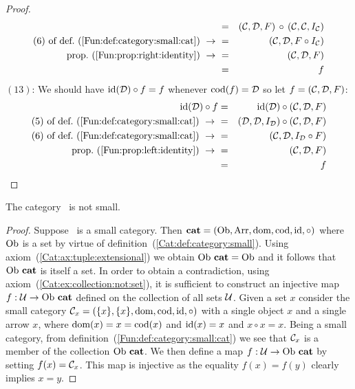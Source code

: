 \begin{proof}
\begin{eqnarray*}
            &=&(\Cat,\Dat,F)\,\circ\,(\Cat,\Cat,I_{\cal C})\\
            \mbox{$(6)$ of def.~(\ref{Fun:def:category:small:cat})}\ \to\ 
            &=&(\Cat,\Dat,F\circ I_{\cal C})\\
            \mbox{prop.~(\ref{Fun:prop:right:identity})}\ \to\ 
            &=&(\Cat,\Dat,F)\\
            &=&f
        \end{eqnarray*}
    $(13)$: We should have $\mbox{\rm id}(\mbox{$\cal D$})\circ f=f$ whenever $\mbox{\rm cod}(f)=\mbox{$\cal D$}$
    so let $f=(\mbox{$\cal C$},\mbox{$\cal D$},F)$:
        \begin{eqnarray*}\id(\Dat)\circ f
            &=&\id(\Dat)\circ(\Cat,\Dat,F)\\
            \mbox{$(5)$ of def.~(\ref{Fun:def:category:small:cat})}\ \to\ 
            &=&(\Dat,\Dat,I_{\cal D})\circ(\Cat,\Dat,F)\\
            \mbox{$(6)$ of def.~(\ref{Fun:def:category:small:cat})}\ \to\ 
            &=&(\Cat,\Dat,I_{\cal D}\circ F)\\
            \mbox{prop.~(\ref{Fun:prop:left:identity})}\ \to\ 
            &=&(\Cat,\Dat,F)\\
            &=&f
        \end{eqnarray*}
\end{proof}

\begin{prop}\label{Fun:prop:cat:not:small}
    The category \cat\ is not small.
\end{prop}
\begin{proof}
    Suppose \cat\ is a small category. Then $\mbox{\bf cat}=(\mbox{\rm Ob}, \mbox{\rm Arr}, \mbox{\rm dom}, \mbox{\rm cod}, \mbox{\rm id}, 
    \circ)$ where $\mbox{\rm Ob}$ is a set by virtue of 
    definition~(\ref{Cat:def:category:small}).
    Using axiom~(\ref{Cat:ax:tuple:extensional}) we obtain $\mbox{\rm Ob}\ \mbox{\bf cat}=\mbox{\rm Ob}$ and
    it follows that $\mbox{\rm Ob}\ \mbox{\bf cat}$ is itself a set. In order to obtain a 
    contradiction, using axiom~(\ref{Cat:ex:collection:not:set}), it is 
    sufficient to construct an injective map $f:{\cal U}\to\mbox{\rm Ob}\ \mbox{\bf cat}$ defined
    on the collection of all sets $\cal U$. Given a set $x$ consider the small
    category ${\cal C}_{x}=(\{x\},\{x\},\mbox{\rm dom},\mbox{\rm cod},\mbox{\rm id},\circ)$ with a single 
    object $x$ and a single arrow $x$, where $\mbox{\rm dom}(x)=x=\mbox{\rm cod}(x)$ and $\mbox{\rm id}(x)=x$
    and $x \circ x = x$. Being a small category, from 
    definition~(\ref{Fun:def:category:small:cat}) we see that ${\cal C}_{x}$ 
    is a member of the collection $\mbox{\rm Ob}\ \mbox{\bf cat}$. We then define a map 
    $f:{\cal U}\to\mbox{\rm Ob}\ \mbox{\bf cat}$ by setting $f(x)={\cal C}_{x}$. This map is
    injective as the equality $f(x)=f(y)$ clearly implies $x=y$.
\end{proof}

